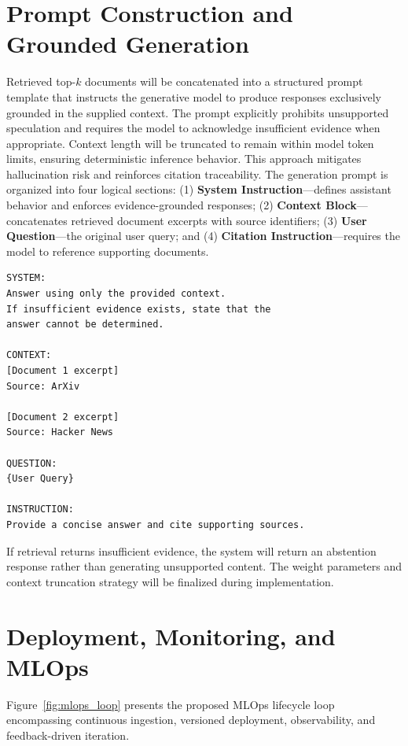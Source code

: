\documentclass[12pt,a4paper]{report}
\begin{document}
\section{Prompt Construction and Grounded Generation}
\label{sec:prompt_ch4}

Retrieved top-$k$ documents will be concatenated into a structured prompt template that instructs the generative model to produce responses exclusively grounded in the supplied context. The prompt explicitly prohibits unsupported speculation and requires the model to acknowledge insufficient evidence when appropriate. Context length will be truncated to remain within model token limits, ensuring deterministic inference behavior. This approach mitigates hallucination risk and reinforces citation traceability. The generation prompt is organized into four logical sections: (1) \textbf{System Instruction}—defines assistant behavior and enforces evidence-grounded responses; (2) \textbf{Context Block}—concatenates retrieved document excerpts with source identifiers; (3) \textbf{User Question}—the original user query; and (4) \textbf{Citation Instruction}—requires the model to reference supporting documents.

\begin{lstlisting}[caption={Proposed Structured Generation Prompt Template.}, label={lst:prompt}]
SYSTEM:
Answer using only the provided context.
If insufficient evidence exists, state that the
answer cannot be determined.

CONTEXT:
[Document 1 excerpt]
Source: ArXiv

[Document 2 excerpt]
Source: Hacker News

QUESTION:
{User Query}

INSTRUCTION:
Provide a concise answer and cite supporting sources.
\end{lstlisting}

If retrieval returns insufficient evidence, the system will return an abstention response rather than generating unsupported content. The weight parameters and context truncation strategy will be finalized during implementation.

\section{Deployment, Monitoring, and MLOps}
\label{sec:mlops}

Figure~\ref{fig:mlops_loop} presents the proposed MLOps lifecycle loop encompassing continuous ingestion, versioned deployment, observability, and feedback-driven iteration.
\end{document}
